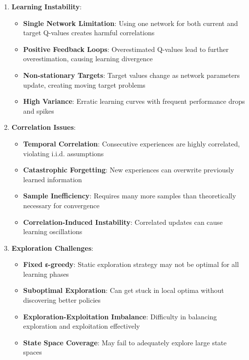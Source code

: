 \documentclass[12pt]{article}
\begin{document}
{{{\begin{enumerate}
    \item \textbf{Learning Instability}:
    \begin{itemize}
        \item \textbf{Single Network Limitation}: Using one network for both current and target Q-values creates harmful correlations
        \item \textbf{Positive Feedback Loops}: Overestimated Q-values lead to further overestimation, causing learning divergence
        \item \textbf{Non-stationary Targets}: Target values change as network parameters update, creating moving target problems
        \item \textbf{High Variance}: Erratic learning curves with frequent performance drops and spikes
    \end{itemize}
    
    \item \textbf{Correlation Issues}:
    \begin{itemize}
        \item \textbf{Temporal Correlation}: Consecutive experiences are highly correlated, violating i.i.d. assumptions
        \item \textbf{Catastrophic Forgetting}: New experiences can overwrite previously learned information
        \item \textbf{Sample Inefficiency}: Requires many more samples than theoretically necessary for convergence
        \item \textbf{Correlation-Induced Instability}: Correlated updates can cause learning oscillations
    \end{itemize}
    
    \item \textbf{Exploration Challenges}:
    \begin{itemize}
        \item \textbf{Fixed ε-greedy}: Static exploration strategy may not be optimal for all learning phases
        \item \textbf{Suboptimal Exploration}: Can get stuck in local optima without discovering better policies
        \item \textbf{Exploration-Exploitation Imbalance}: Difficulty in balancing exploration and exploitation effectively
        \item \textbf{State Space Coverage}: May fail to adequately explore large state spaces
    \end{itemize}
    

\end{enumerate}}}}
\end{document}
